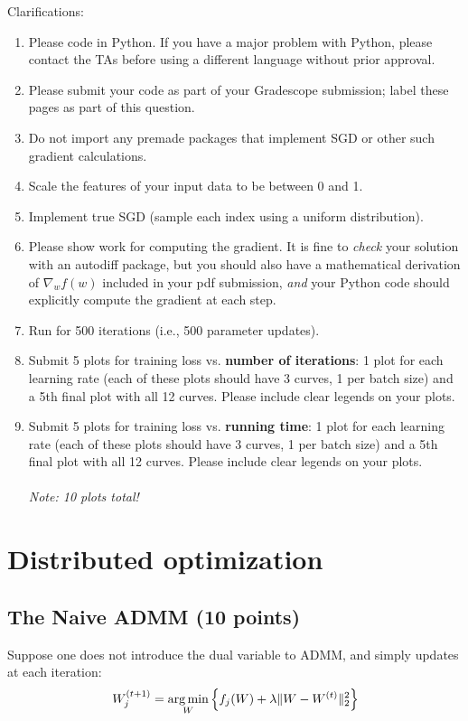 Clarifications:
\begin{enumerate}
\item Please code in Python. If you have a major problem with Python, please contact the TAs before using a different language without prior approval.
\item Please submit your code as part of your Gradescope submission; label these pages as part of this question.
\item Do not import any premade packages that implement SGD or other such gradient calculations.
\item Scale the features of your input data to be between 0 and 1.
\item Implement true SGD (sample each index using a uniform distribution).
\item Please show work for computing the gradient. It is fine to \emph{check} your solution with an autodiff package, but you should also have a mathematical derivation of $\nabla_w f(w)$ included in your pdf submission, \emph{and} your Python code should explicitly compute the gradient at each step.
\item Run for 500 iterations (i.e., 500 parameter updates).
\item Submit 5 plots for training loss vs. \textbf{number of iterations}: 1 plot for each learning rate (each of these plots should have 3 curves, 1 per batch size) and a 5th final plot with all 12 curves. Please include clear legends on your plots.
\item Submit 5 plots for training loss vs. \textbf{running time}: 1 plot for each learning rate (each of these plots should have 3 curves, 1 per batch size) and a 5th final plot with all 12 curves. Please include clear legends on your plots.\\\\
\emph{Note: 10 plots total!}
\end{enumerate}





\newpage
\section{Distributed optimization}

\subsection{The Naive ADMM (10 points)}\label{admm_counter}

Suppose one does not introduce the dual variable to ADMM, and simply updates at each iteration:
$$W_j^{(t + 1)} = \argmin_W \left\{ f_j(W) + \lambda \| W - W^{(t)} \|_2^2 \right\}$$

